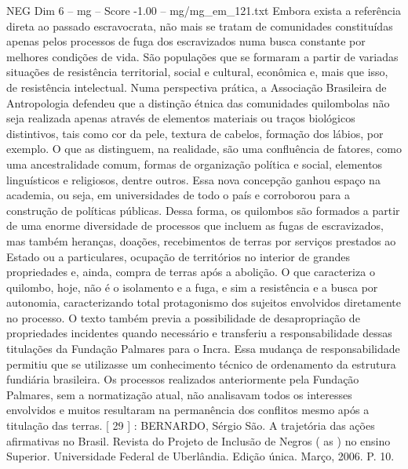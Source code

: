 \begin{textsample}{NEG Dim 6 – mg – Score -1.00 – mg/mg\_em\_121.txt}
Embora exista a referência direta ao passado escravocrata, não mais se tratam de comunidades constituídas apenas pelos processos de fuga dos escravizados numa busca constante por melhores condições de vida.
São populações que se formaram a partir de variadas situações de resistência territorial, social e cultural, econômica e, mais que isso, de resistência intelectual.
Numa perspectiva prática, a Associação Brasileira de Antropologia defendeu que a distinção étnica das comunidades quilombolas não seja realizada apenas através de elementos materiais ou traços biológicos distintivos, tais como cor da pele, textura de cabelos, formação dos lábios, por exemplo.
O que as distinguem, na realidade, são uma confluência de fatores, como uma ancestralidade comum, formas de organização política e social, elementos linguísticos e religiosos, dentre outros.
Essa nova concepção ganhou espaço na academia, ou seja, em universidades de todo o país e corroborou para a construção de políticas públicas.
Dessa forma, os quilombos são formados a partir de uma enorme diversidade de processos que incluem as fugas de escravizados, mas também heranças, doações, recebimentos de terras por serviços prestados ao Estado ou a particulares, ocupação de territórios no interior de grandes propriedades e, ainda, compra de terras após a abolição.
O que caracteriza o quilombo, hoje, não é o isolamento e a fuga, e sim a resistência e a busca por autonomia, caracterizando total protagonismo dos sujeitos envolvidos diretamente no processo.
O texto também previa a possibilidade de desapropriação de propriedades incidentes quando necessário e transferiu a responsabilidade dessas titulações da Fundação Palmares para o Incra.
Essa mudança de responsabilidade permitiu que se utilizasse um conhecimento técnico de ordenamento da estrutura fundiária brasileira.
Os processos realizados anteriormente pela Fundação Palmares, sem a normatização atual, não analisavam todos os interesses envolvidos e muitos resultaram na permanência dos conflitos mesmo após a titulação das terras. [ 29 ] : BERNARDO, Sérgio São.
A trajetória das ações afirmativas no Brasil.
Revista do Projeto de Inclusão de Negros ( as ) no ensino Superior.
Universidade Federal de Uberlândia.
Edição única.
Março, 2006.
P. 10.

\end{textsample}

